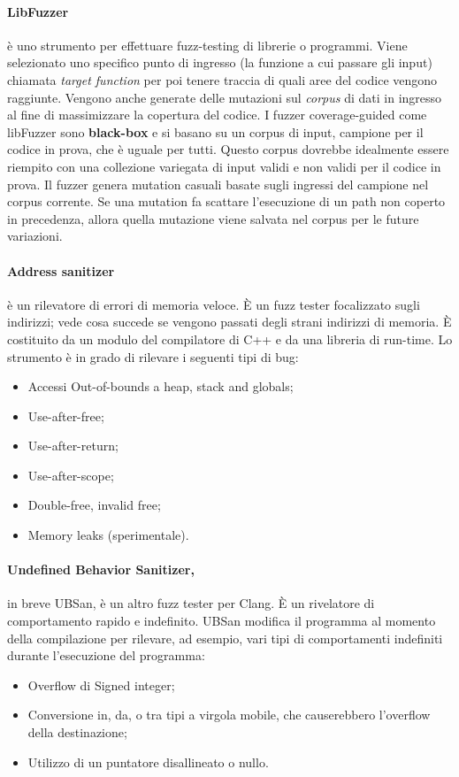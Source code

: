 \paragraph{LibFuzzer} è uno strumento per effettuare fuzz-testing di librerie o programmi.
Viene selezionato uno specifico punto di ingresso (la funzione a cui passare gli input)
chiamata \textit{target function} per poi tenere traccia di quali aree del codice
vengono raggiunte. Vengono anche generate delle mutazioni sul
\textit{corpus} di dati in ingresso al fine di massimizzare la copertura del codice.
I fuzzer coverage-guided come libFuzzer sono \textbf{black-box} e si basano su un
corpus di input,
campione per il codice in prova, che è uguale per tutti.
Questo corpus dovrebbe idealmente essere riempito con una collezione variegata di input
validi e non validi per il codice in prova.
Il fuzzer genera mutation casuali basate sugli ingressi del campione nel corpus corrente.
Se una mutation fa scattare l'esecuzione di un path non coperto in precedenza,
allora quella mutazione viene salvata nel corpus per le future variazioni.

\paragraph{Address sanitizer} è un rilevatore di errori di memoria veloce.
È un fuzz tester focalizzato sugli indirizzi; vede cosa succede se vengono passati degli
strani indirizzi di memoria.
È costituito da un modulo del compilatore di C++ e da una libreria di run-time.
Lo strumento è in grado di rilevare i seguenti tipi di bug:

\begin{itemize}
    \item Accessi Out-of-bounds a heap, stack and globals;
    \item Use-after-free;
    \item Use-after-return;
    \item Use-after-scope;
    \item Double-free, invalid free;
    \item Memory leaks (sperimentale).
\end{itemize}

\paragraph{Undefined Behavior Sanitizer,} in breve UBSan, è un altro fuzz tester per Clang.
È un rivelatore di comportamento rapido e indefinito.
UBSan modifica il programma al momento della compilazione per rilevare, ad esempio,
vari tipi di comportamenti indefiniti durante l'esecuzione del programma:

\begin{itemize}
    \item Overflow di Signed integer;
    \item Conversione in, da, o tra tipi a virgola mobile, che causerebbero l'overflow della
          destinazione;
    \item Utilizzo di un puntatore disallineato o nullo.
\end{itemize}